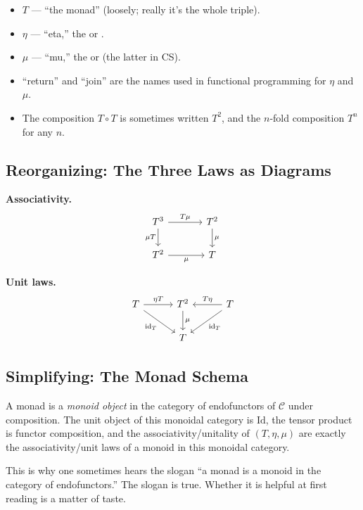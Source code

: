 \begin{howtosay}
\begin{itemize}
  \item $T$ --- ``the monad'' (loosely; really it's the whole triple).
  \item $\eta$ --- ``eta,'' the  or .
  \item $\mu$ --- ``mu,'' the  or  (the
        latter in CS).
  \item ``return'' and ``join'' are the names used in functional
        programming for $\eta$ and $\mu$.
  \item The composition $T \circ T$ is sometimes written $T^2$, and the
        $n$-fold composition $T^n$ for any $n$.
\end{itemize}
\end{howtosay}

\subsection{Reorganizing: The Three Laws as Diagrams}

\textbf{Associativity.}
\[
\begin{tikzcd}[column sep=3.5em]
  T^3 \arrow[r, "T \mu"] \arrow[d, "\mu T"'] & T^2 \arrow[d, "\mu"] \\
  T^2 \arrow[r, "\mu"'] & T
\end{tikzcd}
\]

\textbf{Unit laws.}
\[
\begin{tikzcd}[column sep=3em, row sep=2em]
  T \arrow[r, "\eta T"] \arrow[dr, "\mathrm{id}_T"'] & T^2 \arrow[d, "\mu"] & T \arrow[l, "T \eta"'] \arrow[dl, "\mathrm{id}_T"] \\
  & T &
\end{tikzcd}
\]

\subsection{Simplifying: The Monad Schema}

A monad is a \emph{monoid object} in the category of endofunctors of
$\mathcal{C}$ under composition. The unit object of this monoidal
category is $\mathrm{Id}$, the tensor product is functor composition, and
the associativity/unitality of $(T, \eta, \mu)$ are exactly the
associativity/unit laws of a monoid in this monoidal category.

This is why one sometimes hears the slogan ``a monad is a monoid in the
category of endofunctors.'' The slogan is true. Whether it is helpful at
first reading is a matter of taste.

